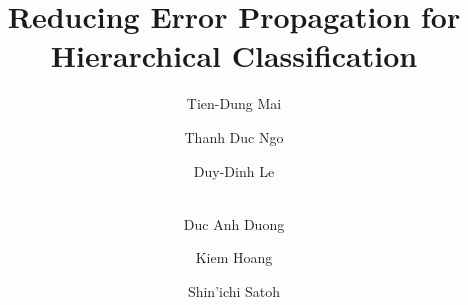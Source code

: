 \documentclass[review]{elsarticle}
\begin{document}
\begin{frontmatter}
\title{ Reducing Error Propagation for Hierarchical Classification }
\author[mymainaddress]{Tien-Dung Mai}

\author[mymainaddress]{Thanh Duc Ngo}

\author[mymainaddress,mysecondaryaddress]{Duy-Dinh Le}

\author[mymainaddress]{\\Duc Anh Duong}

\author[mymainaddress]{Kiem Hoang}

\author[mysecondaryaddress]{Shin'ichi Satoh}

\address[mymainaddress]{University of Information Technology, VNU-HCM, Ho Chi Minh City, Vietnam }
\address[mysecondaryaddress]{National Institute of Informatics, 2-1-2 Hitotsubashi, Chiyoda-ku, Tokyo, Japan}

\begin{abstract}


\end{abstract}
\end{frontmatter}
\end{document}
